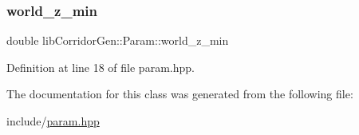 \mbox{\label{classlib_corridor_gen_1_1_param_a02c38a168cd5ffa1f02d7c36789dd292}} 
\subsubsection{\texorpdfstring{world\+\_\+z\+\_\+min}{world\_z\_min}}
{\footnotesize\ttfamily double lib\+Corridor\+Gen\+::\+Param\+::world\+\_\+z\+\_\+min}



Definition at line 18 of file param.\+hpp.



The documentation for this class was generated from the following file\+:\begin{DoxyCompactItemize}
\item 
include/\hyperlink{param_8hpp}{param.\+hpp}\end{DoxyCompactItemize}
